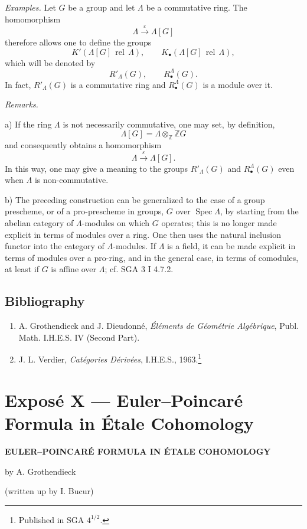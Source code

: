 \documentclass[11pt]{article}
\DeclareMathOperator{\Spec}{Spec}
\providecommand{\Spec}{\operatorname{Spec}}
\providecommand{\Spec}{\operatorname{Spec}}
\begin{document}
\emph{Examples.} Let $G$ be a group and let $\Lambda$ be a commutative ring. The homomorphism
\[
\Lambda\xrightarrow{\varepsilon}\Lambda[G]
\]
therefore allows one to define the groups
\[
K'(\Lambda[G]\operatorname{\,rel\,}\Lambda),\qquad
K_\bullet(\Lambda[G]\operatorname{\,rel\,}\Lambda),
\]
which will be denoted by
\[
R'_\Lambda(G),\qquad R^\Lambda_\bullet(G).
\]
In fact, $R'_\Lambda(G)$ is a commutative ring and $R^\Lambda_\bullet(G)$ is a module over it.

\emph{Remarks.}

a) If the ring $\Lambda$ is not necessarily commutative, one may set, by definition,
\[
\Lambda[G]=\Lambda\otimes_{\mathbb Z}\mathbb ZG
\]
and consequently obtains a homomorphism
\[
\Lambda\xrightarrow{\varepsilon}\Lambda[G].
\]
In this way, one may give a meaning to the groups $R'_\Lambda(G)$ and $R^\Lambda_\bullet(G)$ even when $\Lambda$ is non-commutative.

b) The preceding construction can be generalized to the case of a group prescheme, or of a pro-prescheme in groups, $G$ over $\Spec\Lambda$, by starting from the abelian category of $\Lambda$-modules on which $G$ operates; this is no longer made explicit in terms of modules over a ring. One then uses the natural inclusion functor into the category of $\Lambda$-modules. If $\Lambda$ is a field, it can be made explicit in terms of modules over a pro-ring, and in the general case, in terms of comodules, at least if $G$ is affine over $\Lambda$; cf. SGA 3 I 4.7.2.

\subsection*{Bibliography}

\begin{enumerate}
\item[{[1]}] A. Grothendieck and J. Dieudonné, \emph{Éléments de Géométrie Algébrique}, Publ. Math. I.H.E.S. IV (Second Part).
\item[{[2]}] J. L. Verdier, \emph{Catégories Dérivées}, I.H.E.S., 1963.\footnote{Published in SGA $4^{1/2}$.}
\end{enumerate}

\section*{Exposé X --- Euler--Poincaré Formula in Étale Cohomology}

\begin{center}
\textbf{EULER--POINCARÉ FORMULA IN ÉTALE COHOMOLOGY}

by A. Grothendieck

(written up by I. Bucur)
\end{center}
\end{document}
